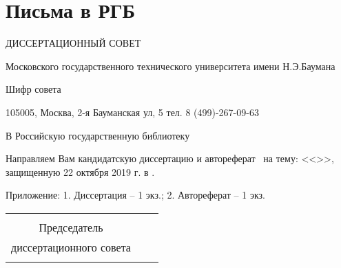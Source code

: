 

\section{Письма в РГБ}

ДИССЕРТАЦИОННЫЙ СОВЕТ

Московского государственного технического университета	 имени Н.Э.Баумана

Шифр совета \    

105005, Москва,
2-я Бауманская ул, 5									
тел. 8 (499)-267-09-63


В Российскую государственную библиотеку




Направляем Вам кандидатскую диссертацию и автореферат \thesisAuthorLastNameFromFull\ на тему: <<\thesisTitle>>, защищенную 22 октября 2019 г. в \thesisInOrganization.

Приложение:
1.	Диссертация – 1 экз.;
2.	Автореферат – 1 экз.




\begin{center}
	\begin{tabular}[c]{c m{4cm} l}
		&            &                     \\
		Председатель       &            &                     \\
		диссертационного совета & \hrulefill & \dcHeadFullFIO      \\
		\dcHeadRegalia      &            &                     \\
	\end{tabular}
\end{center}

\clearpage